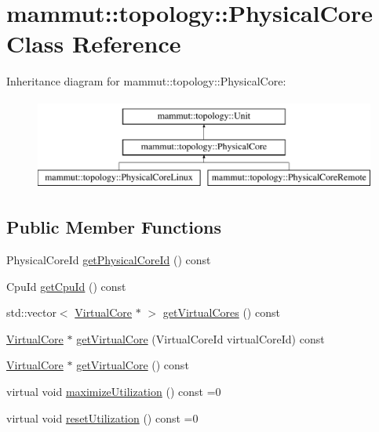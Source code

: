 \hypertarget{classmammut_1_1topology_1_1PhysicalCore}{\section{mammut\-:\-:topology\-:\-:Physical\-Core Class Reference}
\label{classmammut_1_1topology_1_1PhysicalCore}
}
Inheritance diagram for mammut\-:\-:topology\-:\-:Physical\-Core\-:\begin{figure}[H]
\begin{center}
\leavevmode
\includegraphics[height=3.000000cm]{classmammut_1_1topology_1_1PhysicalCore}
\end{center}
\end{figure}
\subsection*{Public Member Functions}
\begin{DoxyCompactItemize}
\item 
Physical\-Core\-Id \hyperlink{classmammut_1_1topology_1_1PhysicalCore_abbd39ff17b300c2ae85e97b6aaef9152}{get\-Physical\-Core\-Id} () const 
\item 
Cpu\-Id \hyperlink{classmammut_1_1topology_1_1PhysicalCore_a70bbe7bbdac1e9d55894b8360c151510}{get\-Cpu\-Id} () const 
\item 
std\-::vector$<$ \hyperlink{classmammut_1_1topology_1_1VirtualCore}{Virtual\-Core} $\ast$ $>$ \hyperlink{classmammut_1_1topology_1_1PhysicalCore_aca8047ed8a42413e67a20d52fefa824b}{get\-Virtual\-Cores} () const 
\item 
\hyperlink{classmammut_1_1topology_1_1VirtualCore}{Virtual\-Core} $\ast$ \hyperlink{classmammut_1_1topology_1_1PhysicalCore_afbf7299cc7f7ab7327c7419214f7de1a}{get\-Virtual\-Core} (Virtual\-Core\-Id virtual\-Core\-Id) const 
\item 
\hyperlink{classmammut_1_1topology_1_1VirtualCore}{Virtual\-Core} $\ast$ \hyperlink{classmammut_1_1topology_1_1PhysicalCore_ac35322afdb84c532fb82a53fcc7376f5}{get\-Virtual\-Core} () const 
\item 
virtual void \hyperlink{classmammut_1_1topology_1_1PhysicalCore_a2fe21bce321b3401e9108bcf29efafae}{maximize\-Utilization} () const =0
\item 
virtual void \hyperlink{classmammut_1_1topology_1_1PhysicalCore_ad6169b49eb4aa01fa570169735875ffe}{reset\-Utilization} () const =0
\end{DoxyCompactItemize}
